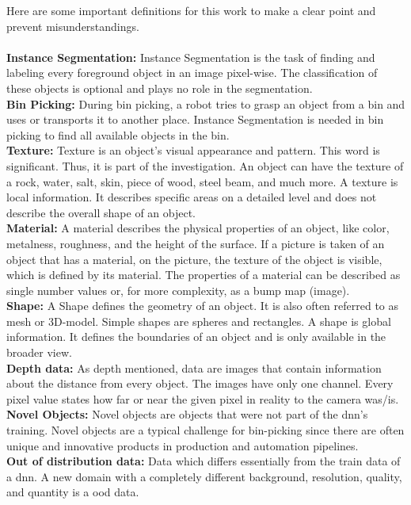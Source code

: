 		Here are some important definitions for this work to make a clear point and prevent misunderstandings.\\
		\\
		\textbf{Instance Segmentation:} Instance Segmentation is the task of finding and labeling every foreground object in an image pixel-wise. The classification of these objects is optional and plays no role in the segmentation.\\
		\textbf{Bin Picking:} During bin picking, a robot tries to grasp an object from a bin and uses or transports it to another place. Instance Segmentation is needed in bin picking to find all available objects in the bin.\\
		\textbf{Texture:} Texture is an object's visual appearance and pattern. This word is significant. Thus, it is part of the investigation. An object can have the texture of a rock, water, salt, skin, piece of wood, steel beam, and much more. A texture is local information. It describes specific areas on a detailed level and does not describe the overall shape of an object.\\
		\textbf{Material:} A material describes the physical properties of an object, like color, metalness, roughness, and the height of the surface. If a picture is taken of an object that has a material, on the picture, the texture of the object is visible, which is defined by its material. The properties of a material can be described as single number values or, for more complexity, as a bump map (image).\\
		\textbf{Shape:} A Shape defines the geometry of an object. It is also often referred to as mesh or 3D-model. Simple shapes are spheres and rectangles. A shape is global information. It defines the boundaries of an object and is only available in the broader view.\\
		\textbf{Depth data:} As depth mentioned, data are images that contain information about the distance from every object. The images have only one channel. Every pixel value states how far or near the given pixel in reality to the camera was/is.\\
		\textbf{Novel Objects:} Novel objects are objects that were not part of the \ac{dnn}'s training. Novel objects are a typical challenge for bin-picking since there are often unique and innovative products in production and automation pipelines.\\
		\textbf{Out of distribution data:} Data which differs essentially from the train data of a \ac{dnn}. A new domain with a completely different background, resolution, quality, and quantity is a \ac{ood} data.\\
